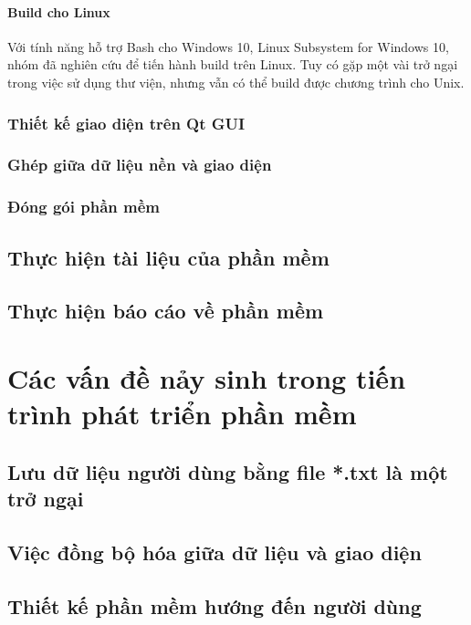 \documentclass[12pt,a4paper]{report}
\begin{document}
		\subsubsection{Build cho Linux}

		Với tính năng hỗ trợ Bash cho Windows 10, Linux Subsystem for Windows 10, nhóm đã nghiên cứu để tiến hành build trên Linux. Tuy có gặp một vài trở ngại trong việc sử dụng thư viện, nhưng vẫn có thể build được chương trình cho Unix.

		\subsection{Thiết kế giao diện trên Qt GUI}
		\subsection{Ghép giữa dữ liệu nền và giao diện}
		\subsection{Đóng gói phần mềm}
	\section{Thực hiện tài liệu của phần mềm}
	\section{Thực hiện báo cáo về phần mềm}
\chapter{Các vấn đề nảy sinh trong tiến trình phát triển phần mềm}
	\section{Lưu dữ liệu người dùng bằng file *.txt là một trở ngại}
	\section{Việc đồng bộ hóa giữa dữ liệu và giao diện}
	\section{Thiết kế phần mềm hướng đến người dùng}
\end{document}

